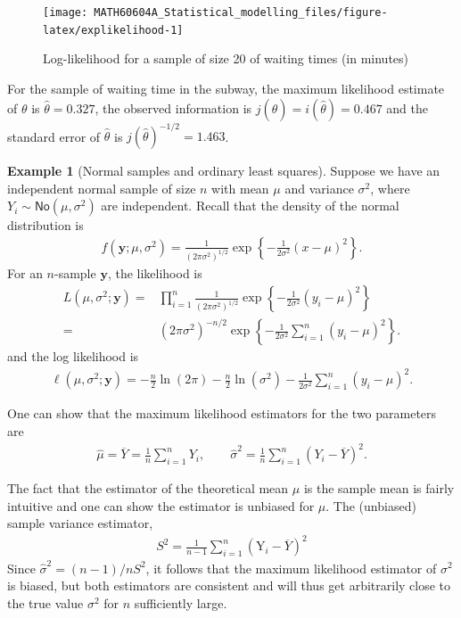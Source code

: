 \documentclass[
  11pt,
  letterpaper,
]{book}
\theoremstyle{definition}
\theoremstyle{definition}
\newtheorem{example}{Example}[chapter]
\theoremstyle{definition}
\theoremstyle{remark}
\begin{document}
\begin{figure}

{\centering \texttt{[image: MATH60604A\_Statistical\_modelling\_files/figure-latex/explikelihood-1]} 

}

\caption{Log-likelihood for a sample of size 20 of waiting times (in minutes)}\label{fig:explikelihood}
\end{figure}

For the sample of waiting time in the subway, the maximum likelihood estimate of \(\theta\) is \(\widehat{\theta}=0.327\), the observed information is \(j(\widehat{\theta})=i(\widehat{\theta})=0.467\) and the standard error of \(\widehat{\theta}\) is \(j(\widehat{\theta})^{-1/2}=1.463\).

\begin{example}[Normal samples and ordinary least squares]
\protect\hypertarget{exm:normal}{}{\label{exm:normal} {} }Suppose we have an independent normal sample of size \(n\) with mean \(\mu\) and variance \(\sigma^2\), where
\(Y_i \sim \mathsf{No}(\mu, \sigma^2)\) are independent.
Recall that the density of the normal distribution is
\begin{align*}
f(\boldsymbol{y}; \mu, \sigma^2)=\frac{1}{(2\pi \sigma^2)^{1/2}}\exp\left\{-\frac{1}{2\sigma^2}(x-\mu)^2\right\}.
\end{align*}
For an \(n\)-sample \(\boldsymbol{y}\), the likelihood is
\begin{align*}
L(\mu, \sigma^2; \boldsymbol{y})=&\prod_{i=1}^n\frac{1}{({2\pi \sigma^2})^{1/2}}\exp\left\{-\frac{1}{2\sigma^2}(y_i-\mu)^2\right\}\\
=&(2\pi \sigma^2)^{-n/2}\exp\left\{-\frac{1}{2\sigma^2}\sum_{i=1}^n(y_i-\mu)^2\right\}.
\end{align*}
and the log likelihood is
\begin{align*}
\ell(\mu, \sigma^2; \boldsymbol{y})=-\frac{n}{2}\ln(2\pi) -\frac{n}{2}\ln(\sigma^2)-\frac{1}{2\sigma^2}\sum_{i=1}^n (y_i-\mu)^2.
\end{align*}

One can show that the maximum likelihood estimators for the two parameters are
\begin{align*}
\widehat{\mu}=\overline{Y}=\frac{1}{n} \sum_{i=1}^n Y_i, \qquad \widehat{\sigma}^2=\frac{1}{n}\sum_{i=1}^n (Y_i-\overline{Y})^2.
\end{align*}

The fact that the estimator of the theoretical mean \(\mu\) is the sample mean is fairly intuitive and one can show the estimator is unbiased for \(\mu\). The (unbiased) sample variance estimator,
\begin{align*}
S^2=\frac{1}{n-1} \sum_{i=1}^n (\mathrm{Y}_i-\overline{Y})^2
\end{align*}
Since \(\widehat{\sigma}^2=(n-1)/n S^2\), it follows that the maximum likelihood estimator of \(\sigma^2\) is biased, but both estimators are consistent and will thus get arbitrarily close to the true value \(\sigma^2\) for \(n\) sufficiently large.


\end{example}
\end{document}
